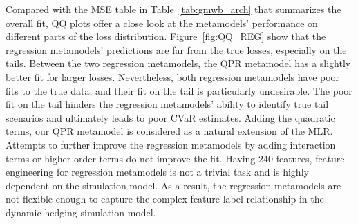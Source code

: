\documentclass{article}
\begin{document}
Compared with the MSE table in Table~\ref{tab:gmwb_arch} that summarizes the overall fit, QQ plots offer a close look at the metamodels' performance on different parts of the loss distribution.
Figure~\ref{fig:QQ_REG} show that the regression metamodels' predictions are far from the true losses, especially on the tails.
Between the two regression metamodels, the QPR metamodel has a slightly better fit for larger losses.
Nevertheless, both regression metamodels have poor fits to the true data, and their fit on the tail is particularly undesirable.
The poor fit on the tail hinders the regression metamodels' ability to identify true tail scenarios and ultimately leads to poor CVaR estimates.
Adding the quadratic terms, our QPR metamodel is considered as a natural extension of the MLR.
Attempts to further improve the regression metamodels by adding interaction terms or higher-order terms do not improve the fit.
Having 240 features, feature engineering for regression metamodels is not a trivial task and is highly dependent on the simulation model. 
As a result, the regression metamodels are not flexible enough to capture the complex feature-label relationship in the dynamic hedging simulation model.
\end{document}
